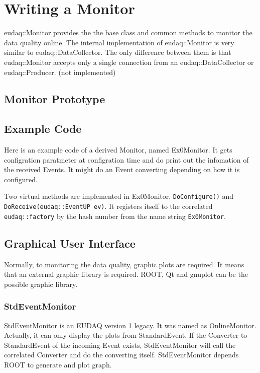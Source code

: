 \section{Writing a Monitor}\label{sec:MonitorWriting}
eudaq::Monitor provides the the base class and common methods to monitor the data quality online. The internal implementation of eudaq::Monitor is very similar to eudaq::DataCollector. The only difference between them is that eudaq::Monitor accepts only a single connection from an eudaq::DataCollector or eudaq::Producer. (not implemented)\\

\subsection{Monitor Prototype}\label{sec:monitor_hh}



\subsection{Example Code}
Here is an example code of a derived Monitor, named Ex0Monitor. It gets configration paratmeter at configration time and do print out the infomation of the received Events. It might do an Event converting depending on how it is configured.

Two virtual methods are implemented in Ex0Monitor, \lstinline[style=cpp]{DoConfigure()} and \lstinline[style=cpp]{DoReceive(eudaq::EventUP ev)}. It registers itself to the correlated \lstinline[style=cpp]{eudaq::factory} by the hash number from the name string \lstinline[style=cpp]{Ex0Monitor}.

\subsection{Graphical User Interface}
Normally, to monitoring the data quality, graphic plots are required. It means that an external graphic library is required. ROOT, Qt
and gnuplot can be the possible graphic library.

\subsubsection{StdEventMonitor}
StdEventMonitor is an EUDAQ version 1 legacy. It was named as OnlineMonitor. Actually, it can only display the plots from StandardEvent. If the Converter to StandardEvent of the incoming Event exists, StdEventMonitor will call the correlated Converter and do the converting itself.
StdEventMonitor depends ROOT to generate and plot graph.

